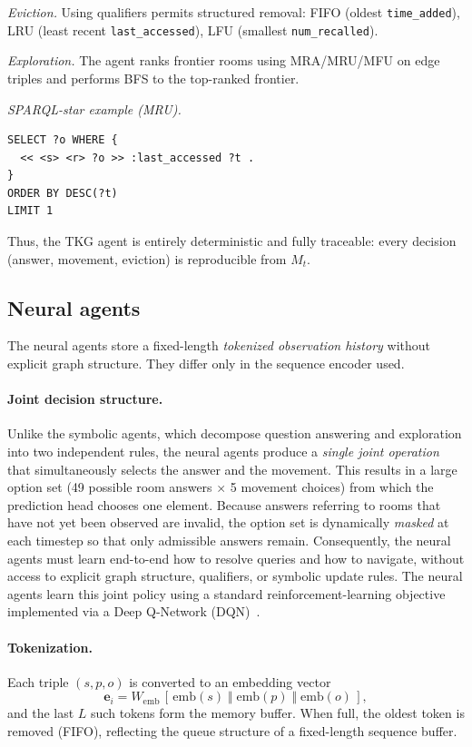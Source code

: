 \documentclass[11pt]{article}
\begin{document}
\emph{Eviction.}  
Using qualifiers permits structured removal:
FIFO (oldest \texttt{time\_added}),  
LRU (least recent \texttt{last\_accessed}),  
LFU (smallest \texttt{num\_recalled}).

\emph{Exploration.}  
The agent ranks frontier rooms using MRA/MRU/MFU on edge triples and
performs BFS to the top-ranked frontier.

\emph{SPARQL-star example (MRU).}
\begin{lstlisting}[language=SPARQL,basicstyle=\ttfamily\small,frame=single]
SELECT ?o WHERE {
  << <s> <r> ?o >> :last_accessed ?t .
}
ORDER BY DESC(?t)
LIMIT 1
\end{lstlisting}

Thus, the TKG agent is entirely deterministic and fully traceable: every
decision (answer, movement, eviction) is reproducible from $M_t$.

\subsection{Neural agents}

The neural agents store a fixed-length \emph{tokenized observation
history} without explicit graph structure. They differ only in the
sequence encoder used.

\paragraph{Joint decision structure.}
Unlike the symbolic agents, which decompose question answering and exploration into two independent rules, the neural agents produce a \emph{single joint operation} that simultaneously selects the answer and the movement. This results in a large option set (49 possible room answers $\times$ 5 movement choices) from which the prediction head chooses one element. Because answers referring to rooms that have not yet been observed are invalid, the option set is dynamically \emph{masked} at each timestep so that only admissible answers remain. Consequently, the neural agents must learn end-to-end how to resolve queries and how to navigate, without access to explicit graph structure, qualifiers, or symbolic update rules. The neural agents learn this joint policy using a standard reinforcement-learning objective implemented via a Deep Q-Network (DQN)~\cite{mnih2013playingatarideepreinforcement}.

\paragraph{Tokenization.}
Each triple $(s,p,o)$ is converted to an embedding vector
\[
\mathbf{e}_i
   = W_{\mathrm{emb}}\,[\,\mathrm{emb}(s)\;\Vert\;\mathrm{emb}(p)
      \;\Vert\;\mathrm{emb}(o)\,],
\]
and the last $L$ such tokens form the memory buffer. When full, the oldest token is removed (FIFO), reflecting the queue structure of a fixed-length sequence buffer.
\end{document}
